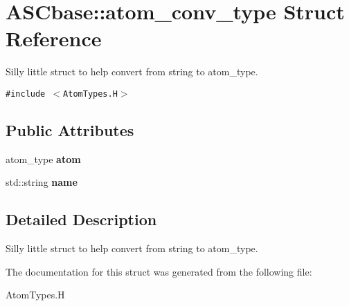 \section{ASCbase::atom\_\-conv\_\-type Struct Reference}
\label{structASCbase_1_1atom__conv__type}
Silly little struct to help convert from string to atom\_\-type.  


{\tt \#include $<$Atom\-Types.H$>$}

\subsection*{Public Attributes}
\begin{CompactItemize}
\item 
atom\_\-type \textbf{atom}\label{structASCbase_1_1atom__conv__type_a815b2f900fc36004e1cfa6abae799e2}

\item 
std::string \textbf{name}\label{structASCbase_1_1atom__conv__type_92e7ee024a311135ac0e9121d6b50eab}

\end{CompactItemize}


\subsection{Detailed Description}
Silly little struct to help convert from string to atom\_\-type. 



The documentation for this struct was generated from the following file:\begin{CompactItemize}
\item 
Atom\-Types.H\end{CompactItemize}
